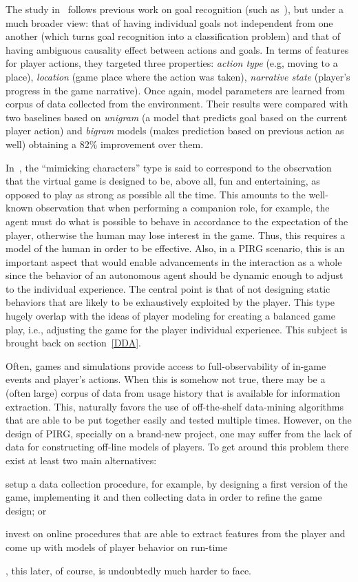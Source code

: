 The study in~\cite{ha2011goal} follows previous work on goal recognition (such as~\cite{mott2006probabilistic}), but under a much broader view: that of having individual goals not independent from one another (which turns goal recognition into a classification problem) and that of having ambiguous causality effect between actions and goals. In terms of features for player actions, they targeted three properties: \textit{action type} (e.g, moving to a place), \textit{location} (game place where the action was taken), \textit{narrative state} (player's progress in the game narrative).  Once again, model parameters are learned from corpus of data collected from the environment. Their results were compared with two baselines based on \textit{unigram} (a model that predicts goal based on the current player action) and \textit{bigram} models (makes prediction based on previous action as well) obtaining a 82\% improvement over them.

In~\cite{Herik_opponentmodelling}, the ``mimicking characters'' type is said to correspond to the observation that the virtual game is designed to be, above all, fun and entertaining, as opposed to play as strong as possible all the time. This amounts to the well-known observation that when performing a companion role, for example, the agent must do what is possible to behave in accordance to the expectation of the player, otherwise the human may lose interest in the game. Thus, this requires a model of the human in order to be effective. Also, in a PIRG scenario, this is an important aspect that would enable advancements in the interaction as a whole since the behavior of an autonomous agent should be dynamic enough to adjust to the individual experience. The central point is that of not designing static behaviors that are likely to be exhaustively exploited by the player. This type hugely overlap with the ideas of player modeling for creating a balanced game play, i.e., adjusting the game for the player individual experience. This subject is brought back on section~\ref{DDA}.  

Often, games and simulations provide access to full-observability of in-game events and player's actions. When this is somehow not true, there may be a (often large) corpus of data from usage history that is available for information extraction. This, naturally favors the use of off-the-shelf data-mining algorithms that are able to be put together easily and tested multiple times. However, on the design of PIRG, specially on a brand-new project, one may suffer from the lack of data for constructing off-line models of players. To get around this problem there exist at least two main alternatives: \begin{inparaenum}\item setup a data collection procedure, for example, by designing a first version of the game, implementing it and then collecting data in order to refine the game design; or \item invest on online procedures that are able to extract features from the player and come up with models of player behavior on run-time\end{inparaenum}, this later, of course, is undoubtedly much harder to face.

